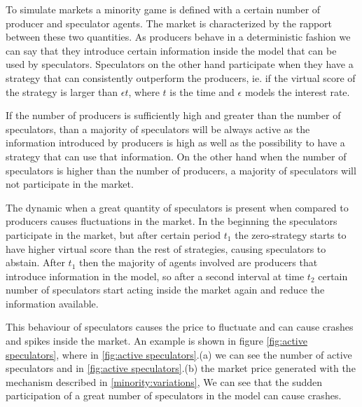 To simulate markets a minority game is defined with a certain number of producer and speculator agents.
The market is characterized by the rapport between these two quantities.
As producers behave in a deterministic fashion we can say that they introduce certain information inside the model that can be used by speculators.
Speculators on the other hand participate when they have a strategy that can consistently outperform the  producers, ie. if the virtual score of the strategy is larger than $\epsilon t$, where $t$ is the time and $\epsilon$ models the interest rate.

If the number of producers is sufficiently high and greater than the number of speculators, than a majority of speculators will be always active as the information introduced by producers is high as well as the possibility to have a strategy that can use that information.
On the other hand when the number of speculators is higher than the number of producers, a majority of speculators will not participate in the market.

The dynamic when a great quantity of speculators is present when compared to producers causes fluctuations in the market.
In the beginning the speculators participate in the market, but after certain period $t_1$ the zero-strategy starts to have higher virtual score than the rest of strategies, causing speculators to abstain.
After $t_1$ then the majority of agents involved are producers that introduce information in the model, so after a second interval at time $t_2$ certain number of speculators start acting inside the market again and reduce the information available.

This behaviour of speculators causes the price to fluctuate and can cause crashes and spikes inside the market.
An example is shown in figure \ref{fig:active speculators}, where in \ref{fig:active speculators}.(a) we can see the number of active speculators and in \ref{fig:active speculators}.(b) the market price generated with the mechanism described in \ref{minority:variations},
We can see that the sudden participation of a great number of speculators in the model can cause crashes. 

